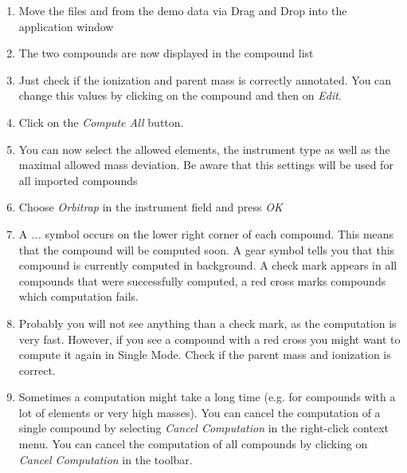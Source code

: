 \documentclass[letterpaper,10pt,openany,oneside]{sphinxmanual}
\newcommand\gui[1]{\textsl{\guilsinglleft#1\guilsinglright\xspace}}
\begin{document}
\begin{enumerate}
	\item {} 
	Move the files  and  from the demo data via Drag and Drop into the application window
	
	\item {} 
	The two compounds are now displayed in the compound list
	
	\item {} 
	Just check if the ionization and parent mass is correctly annotated. You can change this values by clicking on the compound and then on \gui{Edit}.
	
	\item {} 
	Click on the \gui{Compute All} button.
	
	\item {} 
	You can now select the allowed elements, the instrument type as well as the maximal allowed mass deviation. Be aware that this settings will be used for all imported compounds
	
	\item {} 
	Choose \gui{Orbitrap} in the instrument field and press \gui{OK}
	
	\item {} 
	A \gui{...} symbol occurs on the lower right corner of each compound. This 
	means that the compound will be computed soon. A gear symbol tells you that 
	this compound is currently computed in background. A check mark appears in 
	all compounds that were successfully computed, a red cross marks compounds 
	which computation fails.
	
	\item {} 
	Probably you will not see anything than a check mark, as the computation is very fast. However, if you see a compound with a red cross you might want to compute it again in Single Mode. Check if the parent mass and ionization is correct.
	
	\item {} 
	Sometimes a computation might take a long time (e.g. for compounds with a lot 
	of elements or very high masses). You can cancel the computation of a single 
	compound by selecting \gui{Cancel Computation} in the right-click context 
	menu. You can cancel the computation of all compounds by clicking on 
	\gui{Cancel Computation} in the toolbar.
\end{enumerate}
\end{document}

